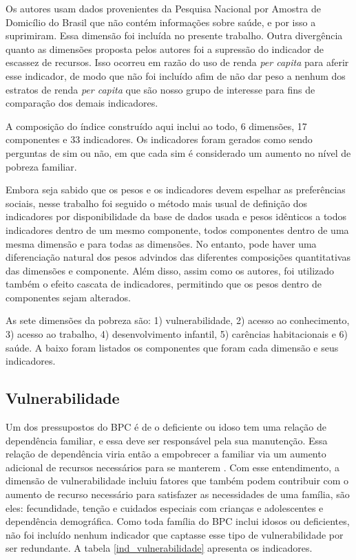 \documentclass[
	12pt,				%
	openright,			%
	twoside,			%
	a4paper,			%
	english,			%
	french,				%
	spanish,			%
	brazil				%
	]{abntex2}
\begin{document}
	 Os autores usam dados provenientes da Pesquisa Nacional por Amostra de Domicílio do Brasil que não contém informações sobre saúde, e por isso a suprimiram. Essa dimensão foi incluída no presente trabalho. Outra divergência quanto as dimensões proposta pelos autores foi a supressão do indicador de escassez de recursos. Isso ocorreu em razão do uso de renda \textit{per capita} para aferir esse indicador, de modo que não foi incluído afim de não dar peso a nenhum dos estratos de renda \textit{per capita} que são nosso grupo de interesse para fins de comparação dos demais indicadores. 
	 
	 A composição do índice construído aqui inclui ao todo, 6 dimensões, 17 componentes e 33 indicadores. Os indicadores foram gerados como sendo perguntas de sim ou não, em que cada sim é considerado um aumento no nível de pobreza familiar.
	 
	  Embora seja sabido que os pesos e os indicadores devem espelhar as preferências sociais, nesse trabalho foi seguido o método mais usual de definição dos indicadores por disponibilidade da base de dados usada e pesos idênticos a todos indicadores dentro de um mesmo componente, todos componentes dentro de uma mesma dimensão e para todas as dimensões. No entanto, pode haver uma diferenciação natural dos pesos advindos das diferentes composições quantitativas das dimensões e componente. Além disso, assim como os autores, foi utilizado também o efeito cascata de indicadores, permitindo que os pesos dentro de componentes sejam alterados. 
	  
	  As sete dimensões da pobreza são: 1) vulnerabilidade, 2) acesso ao conhecimento, 3) acesso ao trabalho, 4) desenvolvimento infantil, 5) carências habitacionais e 6) saúde. A baixo foram listados os componentes que foram cada dimensão e seus indicadores. 
	  
	  \subsection{Vulnerabilidade}
	  Um dos pressupostos do BPC é de o deficiente ou idoso tem uma relação de dependência familiar, e essa deve ser responsável pela sua manutenção. Essa relação de dependência viria então a empobrecer a familiar via um aumento adicional de recursos necessários para se manterem \cite{diniz2006deficiencia}. Com esse entendimento, a dimensão de vulnerabilidade incluiu fatores que também podem contribuir com o aumento de recurso necessário para satisfazer as necessidades de uma família, são eles: fecundidade, tenção e cuidados especiais com crianças e adolescentes e dependência demográfica. Como toda família do BPC inclui idosos ou deficientes, não foi incluído nenhum indicador que captasse esse tipo de vulnerabilidade por ser redundante. A tabela \ref{ind_vulnerabilidade} apresenta os indicadores.
	  
\end{document}
